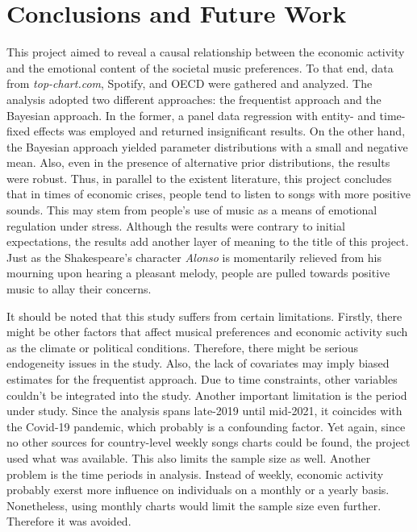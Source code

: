 \documentclass[12pt]{article}
\begin{document}
\section{Conclusions and Future Work}

This project aimed to reveal a causal relationship between the economic activity and the emotional content of the societal music preferences. To that end, data from \textit{top-chart.com}, Spotify, and OECD were gathered and analyzed. The analysis adopted two different approaches: the frequentist approach and the Bayesian approach. In the former, a panel data regression with entity- and time-fixed effects was employed and returned insignificant results. On the other hand, the Bayesian approach yielded parameter distributions with a small and negative mean. Also, even in the presence of alternative prior distributions, the results were robust. Thus, in parallel to the existent literature, this project concludes that in times of economic crises, people tend to listen to songs with more positive sounds. This may stem from people's use of music as a means of emotional regulation under stress. Although the results were contrary to initial expectations, the results add another layer of meaning to the title of this project. Just as the Shakespeare's character \textit{Alonso} is momentarily relieved from his mourning upon hearing a pleasant melody, people are pulled towards positive music to allay their concerns.

It should be noted that this study suffers from certain limitations. Firstly, there might be other factors that affect musical preferences and economic activity such as the climate or political conditions. Therefore, there might be serious endogeneity issues in the study. Also, the lack of covariates may imply biased estimates for the frequentist approach. Due to time constraints, other variables couldn't be integrated into the study. Another important limitation is the period under study. Since the analysis spans late-2019 until mid-2021, it coincides with the Covid-19 pandemic, which probably is a confounding factor. Yet again, since no other sources for country-level weekly songs charts could be found, the project used what was available. This also limits the sample size as well. Another problem is the time periods in analysis. Instead of weekly, economic activity probably exerst more influence on individuals on a monthly or a yearly basis. Nonetheless, using monthly charts would limit the sample size even further. Therefore it was avoided.
\end{document}
